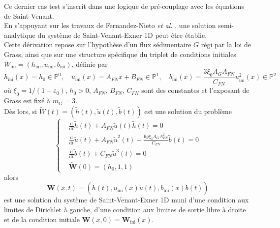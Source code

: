 \documentclass[11pt, a4paper, oneside]{report}
\begin{document}
Ce dernier cas test s'inscrit dans une logique de pré-couplage avec les équations de Saint-Venant. \\
En s'appuyant sur les travaux de Fernandez-Nieto \textit{et al.} \cite{fernandez2025third}, une solution semi-analytique du système de Saint-Venant-Exner 1D peut être établie. \\
Cette dérivation repose sur l'hypothèse d'un flux sédimentaire $G$ régi par la loi de Grass, ainsi que sur une structure spécifique du triplet de conditions initiales $W_\text{ini} = (h_\text{ini}, u_\text{ini}, b_\text{ini})$, définie par
\begin{equation}
    h_\text{ini}(x) = h_0 \in \mathbb{P}^0, \quad u_\text{ini}(x) = A_{FN} x + B_{FN} \in \mathbb{P}^1, \quad b_\text{ini}(x) = \frac{3 \xi_0 A_G A_{FN}}{C_{FN}} u_\text{ini}^2(x) \in \mathbb{P}^2
\end{equation}
où $\xi_0 = 1/(1 - \varepsilon_0)$, $h_0 > 0$, $A_{FN}$, $B_{FN}$, $C_{FN}$ sont des constantes et l'exposant de Grass est fixé à $m_G = 3$. \\
Dès lors, si $\displaystyle \widetilde{W}(t) = \left( \widetilde{h}(t), \widetilde{u}(t), \widetilde{b}(t) \right)$ est une solution du problème
\begin{equation} \label{eq:Fernandez_Nieto_EDO}
    \left \{
    \begin{aligned}
        & \frac{\text{d}}{\text{d}t} \widetilde{h}(t) + A_{FN} \widetilde{u}(t) \widetilde{h}(t) = 0 \\
        & \frac{\text{d}}{\text{d}t} \widetilde{u}(t) + A_{FN} \widetilde{u}^2(t) + \frac{6 g \xi_0 A_G A_{FN}^2}{C_{FN}} \widetilde{b}(t) = 0 \\
        & \frac{\text{d}}{\text{d}t} \widetilde{b}(t) + C_{FN} \widetilde{u}^3(t) = 0 \\
        & \widetilde{\bm{W}}(0) = (h_0, 1, 1)
    \end{aligned}
    \right .
\end{equation}
alors
\begin{equation}
    \bm{W}(x, t) = \left( \widetilde{h}(t), u_\text{ini}(x) \widetilde{u}(t), b_\text{ini}(x) \widetilde{b}(t) \right)
\end{equation}
est une solution du système de Saint-Venant-Exner 1D muni d'une condition aux limites de Dirichlet à gauche, d'une condition aux limites de sortie libre à droite et de la condition initiale $\bm{W}(x, 0) = \bm{W}_\text{ini}(x)$. \\
\end{document}
